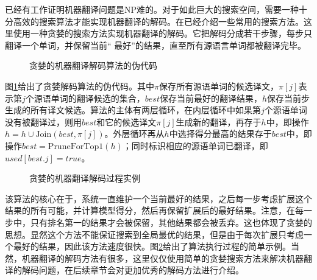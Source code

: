 \parinterval 已经有工作证明机器翻译问题是NP难的。对于如此巨大的搜索空间，需要一种十分高效的搜索算法才能实现机器翻译的解码。在{\chaptertwo}已经介绍一些常用的搜索方法。这里使用一种贪婪的搜索方法实现机器翻译的解码。它把解码分成若干步骤，每步只翻译一个单词，并保留当前“ 最好”的结果，直至所有源语言单词都被翻译完毕。
\vspace{0.3em}
\begin{figure}[htp]
    \centering

    \caption{贪婪的机器翻译解码算法的伪代码}
    \label{fig:5-10}
\end{figure}

\parinterval 图\ref{fig:5-10}给出了贪婪解码算法的伪代码。其中$\pi$保存所有源语单词的候选译文，$\pi[j]$表示第$j$个源语单词的翻译候选的集合，$best$保存当前最好的翻译结果，$h$保存当前步生成的所有译文候选。算法的主体有两层循环，在内层循环中如果第$j$个源语单词没有被翻译过，则用$best$和它的候选译文$\pi[j]$生成新的翻译，再存于$h$中，即操作$h=h\cup{\textrm{Join}(best,\pi[j])}$。外层循环再从$h$中选择得分最高的结果存于$best$中，即操作$best=\textrm{PruneForTop1}(h)$；同时标识相应的源语单词已翻译，即$used[best.j]=true$。


\begin{figure}[htp]
    \centering
\subfigure{}
\subfigure{}
    \caption{贪婪的机器翻译解码过程实例}
    \label{fig:5-11}
\end{figure}

该算法的核心在于，系统一直维护一个当前最好的结果，之后每一步考虑扩展这个结果的所有可能，并计算模型得分，然后再保留扩展后的最好结果。注意，在每一步中，只有排名第一的结果才会被保留，其他结果都会被丢弃。这也体现了贪婪的思想。显然这个方法不能保证搜索到全局最优的结果，但是由于每次扩展只考虑一个最好的结果，因此该方法速度很快。图\ref{fig:5-11}给出了算法执行过程的简单示例。当然，机器翻译的解码方法有很多，这里仅仅使用简单的贪婪搜索方法来解决机器翻译的解码问题，在后续章节会对更加优秀的解码方法进行介绍。

